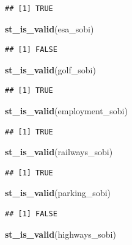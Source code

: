\documentclass[
]{article}
\newenvironment{Shaded}{\begin{snugshade}}{\end{snugshade}}
\newcommand{\KeywordTok}[1]{\textcolor[rgb]{0.13,0.29,0.53}{\textbf{#1}}}
\newcommand{\NormalTok}[1]{#1}
\begin{document}
\begin{verbatim}
## [1] TRUE
\end{verbatim}

\begin{Shaded}
\begin{Highlighting}[]
\KeywordTok{st_is_valid}\NormalTok{(esa_sobi)}
\end{Highlighting}
\end{Shaded}

\begin{verbatim}
## [1] FALSE
\end{verbatim}

\begin{Shaded}
\begin{Highlighting}[]
\KeywordTok{st_is_valid}\NormalTok{(golf_sobi)}
\end{Highlighting}
\end{Shaded}

\begin{verbatim}
## [1] TRUE
\end{verbatim}

\begin{Shaded}
\begin{Highlighting}[]
\KeywordTok{st_is_valid}\NormalTok{(employment_sobi)}
\end{Highlighting}
\end{Shaded}

\begin{verbatim}
## [1] TRUE
\end{verbatim}

\begin{Shaded}
\begin{Highlighting}[]
\KeywordTok{st_is_valid}\NormalTok{(railways_sobi)}
\end{Highlighting}
\end{Shaded}

\begin{verbatim}
## [1] TRUE
\end{verbatim}

\begin{Shaded}
\begin{Highlighting}[]
\KeywordTok{st_is_valid}\NormalTok{(parking_sobi)}
\end{Highlighting}
\end{Shaded}

\begin{verbatim}
## [1] FALSE
\end{verbatim}

\begin{Shaded}
\begin{Highlighting}[]
\KeywordTok{st_is_valid}\NormalTok{(highways_sobi)}
\end{Highlighting}
\end{Shaded}
\end{document}
